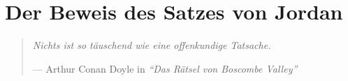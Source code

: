 %
%
%
%
\chapter{Der Beweis des Satzes von Jordan\label{chapter:jordan}}
\begin{refsection}
%
%

\begin{quote}
    \itshape Nichts ist so täuschend wie eine offenkundige Tatsache.

    \hfill\normalfont --- Arthur Conan Doyle in \emph{``Das Rätsel von Boscombe Valley''} \cite{jordan:doyle}
\end{quote}













\printbibliography[heading=subbibliography]
\end{refsection}
